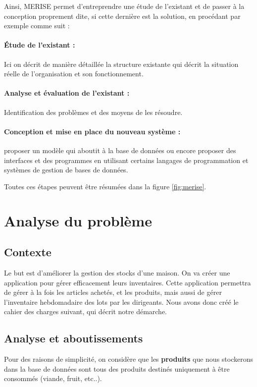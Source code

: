 Ainsi, MERISE permet d'entreprendre une étude de l'existant et de passer à la conception proprement dite, si cette dernière est la solution, en procédant par exemple comme suit :

\paragraph{Étude de l'existant :} Ici on décrit de manière détaillée la structure existante qui décrit la situation réelle de l'organisation et son fonctionnement.
\paragraph{Analyse et évaluation de l'existant :} Identification des problèmes et des moyens de les résoudre.
\paragraph{Conception et mise en place du nouveau système :} proposer un modèle qui aboutit à la base de données ou encore proposer des interfaces et des programmes en utilisant certains langages de programmation et systèmes de gestion de bases de données.


Toutes ces étapes peuvent être résumées dans la figure \ref{fig:merise}.


\section{Analyse du problème}
\subsection{Contexte}
Le but est d'améliorer la gestion des stocks d’une maison. On va créer une application pour gérer efficacement leurs inventaires. Cette application permettra de gérer à la fois les articles achetés, et les produits, mais aussi de gérer l'inventaire hebdomadaire des lots par les dirigeants. Nous avons donc créé le cahier des charges suivant, qui décrit notre démarche.

\subsection{Analyse et aboutissements}
Pour des raisons de simplicité, on considère que les \textbf{produits} que nous stockerons dans la base de données sont tous des produits destinés uniquement à être consommés (viande, fruit, etc..).

